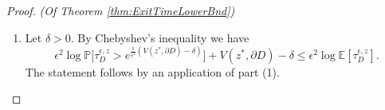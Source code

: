 \documentclass[10pt, reqno]{amsart}
\newcommand{\pr}{\mathbb{P}}
\newcommand{\ex}{\mathbb{E}}
\theoremstyle{definition}
\numberwithin{lem}{section}
\numberwithin{cor}{section}
\numberwithin{prop}{section}
\numberwithin{thm}{section}
\numberwithin{dfn}{section}
\begin{document}
\begin{proof}{\textit{(Of Theorem \ref{thm:ExitTimeLowerBnd})}}
\begin{enumerate}
\begin{equation*}
\begin{aligned}
        \{\tau_D^{\epsilon,z}\leq kT_0 \}\subset\bigcup_{m=0}^{k}\{\tau_D^{\epsilon,z}=\tau^{\epsilon,z}_{m}   \}\cup\bigcup_{m=0}^{k}\{ \tau^{\epsilon,z}_{m+1}-\tau^{\epsilon,z}_{m} \leq T_0  \}
    \end{aligned}
\end{equation*}
( see e.g. the proof of \cite[Theorem 5.7.11(a)]{dembo2009large} for a similar argument). Thus, 
\begin{equation*}
    \begin{aligned}
        \pr\big[  \tau_D^{\epsilon,z}\leq kT_0   \big]&\leq \sum_{m=0}^{k}\bigg(\pr\big[\tau_D^{\epsilon,z}=\tau^{\epsilon,z}_{m}      \big]+\pr\big[ \theta^{\epsilon,z}_{m+1}-\tau^{\epsilon,z}_{m} \leq T_0  \big]    \bigg)\\&
        \leq \pr\big[\tau_D^{\epsilon,z}=\tau^{\epsilon,z}_{0}      \big]+ 2k\exp\bigg\{-\frac{1}{\epsilon^2}\bigg( V(z^*,\partial D)-\frac{\delta}{2}\bigg)\bigg\}\\&
        \leq \pr\big[ Z^{\epsilon}_z(\tau_{\rho}^{\epsilon, z}  )\in\partial D\big]+2k\exp\bigg\{-\frac{1}{\epsilon^2}\bigg( V(z^*,\partial D)-\frac{\delta}{2}\bigg)\bigg\},
    \end{aligned}
\end{equation*}
where we used \eqref{eq:lbaux1}, \eqref{eq:lbaux2} and the fact that $\theta^{\epsilon,z}_{m+1}\leq\tau^{\epsilon,z}_{m+1} $ almost surely. Letting $$k=k_0(\epsilon):=\bigg[\frac{1}{T_0}\exp\bigg\{ \frac{V( z^*,\partial D)-\delta      }{\epsilon^2} \bigg\}  \bigg]+1,$$
where $[\cdot]$ here is the integer part,
we obtain the estimate 
\begin{equation*}
   \pr\big[  \tau_D^{\epsilon,z}\leq e^{\frac{1}{\epsilon^2}(V( z^*,\partial D)-\delta  )     }  \big]\leq \pr\big[  \tau_D^{\epsilon,z}\leq k_0T_0   \big]\leq \pr\big[ Z^{\epsilon}_z(\tau_{\rho}^{\epsilon, z}  )\in\partial D\big]+Ce^{-\frac{\delta}{2\epsilon^2}}
\end{equation*}
which holds for $\epsilon$ sufficiently small. From an application of Lemma \ref{lem:smallballlimit} we conclude that the right-hand side converges to $0$ as $\epsilon\to 0.$ The argument is complete.
\item Let $\delta>0.$ By Chebyshev's inequality we have 
\begin{equation*}
  \epsilon^2\log\pr\bigg[  \tau_D^{\epsilon,z}>e^{\frac{1}{\epsilon^2}(V( z^*,\partial D)-\delta  )     }  \bigg] +V( z^*,\partial D)-\delta \leq \epsilon^2\log\ex[ \tau_D^{\epsilon,z}].
   \end{equation*}
   The statement follows by an application of part (1).\end{enumerate}\end{proof}
\end{document}
